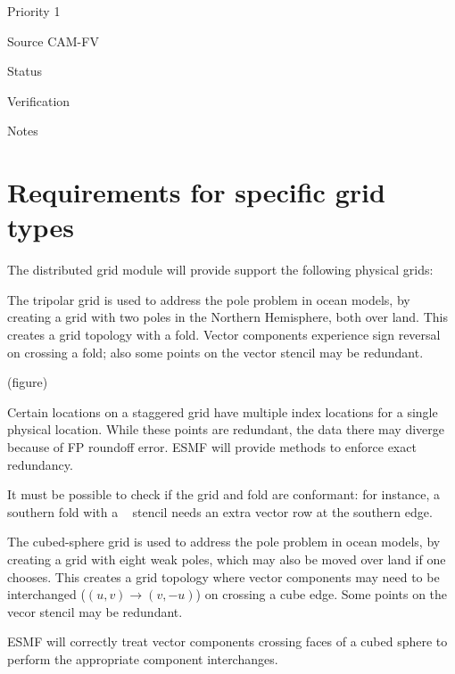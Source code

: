 \begin{reqlist}
\item[Priority] 1
\item[Source] CAM-FV
\item[Status]
\item[Verification]
\item[Notes]
\end{reqlist}

\part{Requirements for specific grid types} \label{DG:gridtypes}

The distributed grid module will provide support the following 
physical grids:


The tripolar grid \cite{ref:m1996} is used to address the pole problem
in ocean models, by creating a grid with two poles in the Northern
Hemisphere, both over land. This creates a grid topology with a
fold. Vector components experience sign reversal on crossing a fold;
also some points on the vector stencil may be redundant.

(figure)



Certain locations on a staggered grid have multiple index locations
for a single physical location. While these points are redundant, the
data there may diverge because of FP roundoff error. ESMF will provide
methods to enforce exact redundancy.


It must be possible to check if the grid and fold are conformant:
for instance, a southern fold with a \bgrid~ stencil needs an extra
vector row at the southern edge.


The cubed-sphere grid \cite{ref:rpm1996} is used to address the pole
problem in ocean models, by creating a grid with eight weak poles,
which may also be moved over land if one chooses. This creates a grid
topology where vector components may need to be interchanged
($(u,v)\longrightarrow(v,-u)$) on crossing a cube edge. Some points on
the vecor stencil may be redundant.


ESMF will correctly treat vector components crossing faces of a cubed
sphere to perform the appropriate component interchanges.

